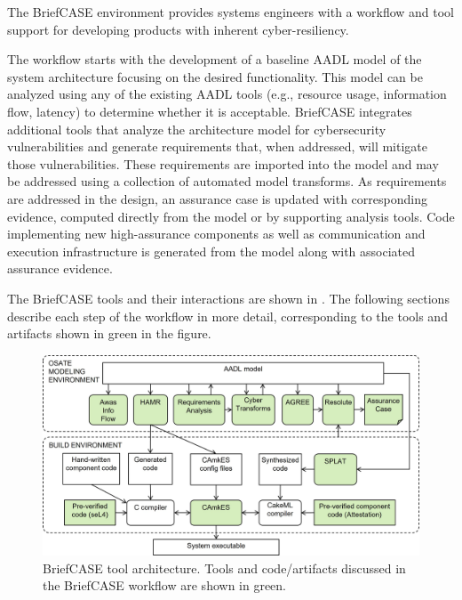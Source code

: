 The BriefCASE environment provides systems engineers with a workflow and tool support for developing
products with inherent cyber-resiliency. 

The  workflow starts with the development of a baseline AADL model of the system architecture
focusing on the desired functionality. This model can be analyzed using any of the existing AADL 
tools (e.g., resource usage, information flow, latency) to determine whether it is acceptable.
BriefCASE integrates additional tools that analyze the architecture model for cybersecurity vulnerabilities and
generate requirements that, when addressed, will mitigate those vulnerabilities.
These requirements are imported into the model and may be addressed using a 
collection of automated model transforms. As requirements are addressed in the design, an assurance case is updated with
corresponding evidence, computed directly from the model or by supporting analysis tools.  
Code implementing new high-assurance components as well as communication and execution infrastructure
is generated from the model along with associated assurance evidence.  

The BriefCASE tools and their interactions are shown in .   
The following sections describe each step of the workflow in more detail, corresponding
to the tools and artifacts shown in green in the figure.  

\begin{figure}
	\begin{center}
	  \includegraphics[width=\textwidth]{./figs/tool-arch.jpg}
  	\end{center}
	\caption{BriefCASE tool architecture.  Tools and code/artifacts discussed in the BriefCASE workflow are shown in green.} 
	\label{fig:tool-arch} 
\end{figure}

